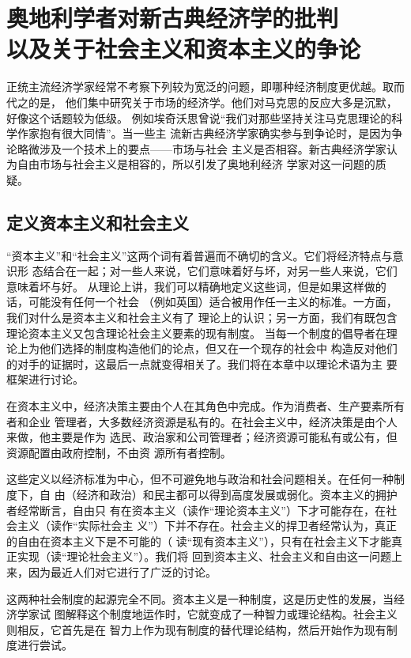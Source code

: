 \chapter{奥地利学者对新古典经济学的批判\\以及关于社会主义和资本主义的争论}


正统主流经济学家经常不考察下列较为宽泛的问题，即哪种经济制度更优越。取而代之的是，
他们集中研究关于市场的经济学。他们对马克思的反应大多是沉默，好像这个话题较为低级。
例如埃奇沃思曾说“我们对那些坚持关注马克思理论的科学作家抱有很大同情”。当一些主
流新古典经济学家确实参与到争论时，是因为争论略微涉及一个技术上的要点——市场与社会
主义是否相容。新古典经济学家认为自由市场与社会主义是相容的，所以引发了奥地利经济
学家对这一问题的质疑。

\section{定义资本主义和社会主义}

“资本主义”和“社会主义”这两个词有着普遍而不确切的含义。它们将经济特点与意识形
态结合在一起；对一些人来说，它们意味着好与坏，对另一些人来说，它们意味着坏与好。
从理论上讲，我们可以精确地定义这些词，但是如果这样做的话，可能没有任何一个社会
（例如英国）适合被用作任一主义的标准。一方面，我们对什么是资本主义和社会主义有了
理论上的认识；另一方面，我们有既包含理论资本主义又包含理论社会主义要素的现有制度。
当每一个制度的倡导者在理论上为他们选择的制度构造他们的论点，但又在一个现存的社会中
构造反对他们的对手的证据时，这最后一点就变得相关了。我们将在本章中以理论术语为主
要框架进行讨论。

在资本主义中，经济决策主要由个人在其角色中完成。作为消费者、生产要素所有者和企业
管理者，大多数经济资源是私有的。在社会主义中，经济决策是由个人来做，他主要是作为
选民、政治家和公司管理者；经济资源可能私有或公有，但资源配置由政府控制，不由资
源所有者控制。

这些定义以经济标准为中心，但不可避免地与政治和社会问题相关。在任何一种制度下，自
由（经济和政治）和民主都可以得到高度发展或弱化。资本主义的拥护者经常断言，自由只
有在资本主义（读作“理论资本主义”）下才可能存在，在社会主义（读作“实际社会主
义”）下并不存在。社会主义的捍卫者经常认为，真正的自由在资本主义下是不可能的（
读“现有资本主义”），只有在社会主义下才能真正实现（读“理论社会主义”）。我们将
回到资本主义、社会主义和自由这一问题上来，因为最近人们对它进行了广泛的讨论。

这两种社会制度的起源完全不同。资本主义是一种制度，这是历史性的发展，当经济学家试
图解释这个制度地运作时，它就变成了一种智力或理论结构。社会主义则相反，它首先是在
智力上作为现有制度的替代理论结构，然后开始作为现有制度进行尝试。

